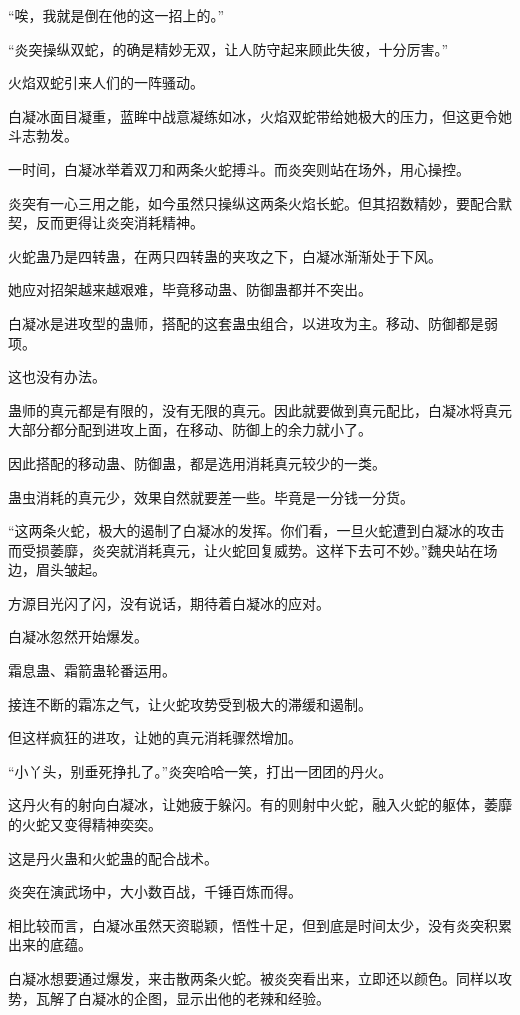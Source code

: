 \begin{this_body}
“唉，我就是倒在他的这一招上的。”

“炎突操纵双蛇，的确是精妙无双，让人防守起来顾此失彼，十分厉害。”

火焰双蛇引来人们的一阵骚动。

白凝冰面目凝重，蓝眸中战意凝练如冰，火焰双蛇带给她极大的压力，但这更令她斗志勃发。

一时间，白凝冰举着双刀和两条火蛇搏斗。而炎突则站在场外，用心操控。

炎突有一心三用之能，如今虽然只操纵这两条火焰长蛇。但其招数精妙，要配合默契，反而更得让炎突消耗精神。

火蛇蛊乃是四转蛊，在两只四转蛊的夹攻之下，白凝冰渐渐处于下风。

她应对招架越来越艰难，毕竟移动蛊、防御蛊都并不突出。

白凝冰是进攻型的蛊师，搭配的这套蛊虫组合，以进攻为主。移动、防御都是弱项。

这也没有办法。

蛊师的真元都是有限的，没有无限的真元。因此就要做到真元配比，白凝冰将真元大部分都分配到进攻上面，在移动、防御上的余力就小了。

因此搭配的移动蛊、防御蛊，都是选用消耗真元较少的一类。

蛊虫消耗的真元少，效果自然就要差一些。毕竟是一分钱一分货。

“这两条火蛇，极大的遏制了白凝冰的发挥。你们看，一旦火蛇遭到白凝冰的攻击而受损萎靡，炎突就消耗真元，让火蛇回复威势。这样下去可不妙。”魏央站在场边，眉头皱起。

方源目光闪了闪，没有说话，期待着白凝冰的应对。

白凝冰忽然开始爆发。

霜息蛊、霜箭蛊轮番运用。

接连不断的霜冻之气，让火蛇攻势受到极大的滞缓和遏制。

但这样疯狂的进攻，让她的真元消耗骤然增加。

“小丫头，别垂死挣扎了。”炎突哈哈一笑，打出一团团的丹火。

这丹火有的射向白凝冰，让她疲于躲闪。有的则射中火蛇，融入火蛇的躯体，萎靡的火蛇又变得精神奕奕。

这是丹火蛊和火蛇蛊的配合战术。

炎突在演武场中，大小数百战，千锤百炼而得。

相比较而言，白凝冰虽然天资聪颖，悟性十足，但到底是时间太少，没有炎突积累出来的底蕴。

白凝冰想要通过爆发，来击散两条火蛇。被炎突看出来，立即还以颜色。同样以攻势，瓦解了白凝冰的企图，显示出他的老辣和经验。


\end{this_body}
